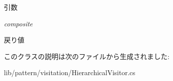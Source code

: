 \begin{DoxyParams}{引数}
\item[{\em composite}]\end{DoxyParams}
\begin{DoxyReturn}{戻り値}

\end{DoxyReturn}


このクラスの説明は次のファイルから生成されました:\begin{DoxyCompactItemize}
\item 
lib/pattern/visitation/HierarchicalVisitor.cs\end{DoxyCompactItemize}
